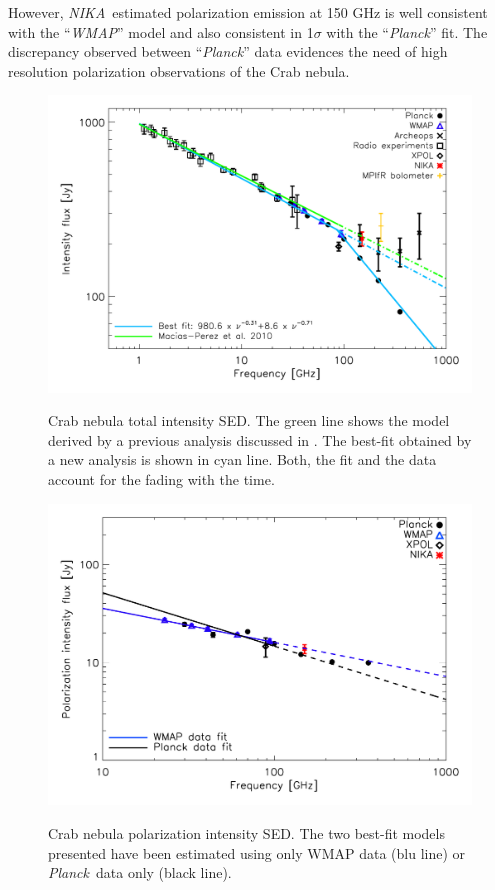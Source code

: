 \documentclass[twocolumn,traditabstract]{aa}
\def\NIKA{\textit{NIKA}}
\def\Planck{\textit{Planck}}
\def\WMAP{\textit{WMAP}}
\begin{document}
However, \NIKA\ estimated polarization emission at 150 GHz is well consistent with the ``\WMAP'' model and also consistent in 1$\sigma$ with the ``\Planck'' fit. 
The discrepancy observed between ``\Planck'' data evidences the need of high resolution polarization observations of the Crab nebula. 
\begin{figure}
  \centering
          { \includegraphics[width=1\linewidth,keepaspectratio]{figures/Crab_SED_i_150.pdf}}
           \caption{Crab nebula total intensity SED. The green line shows the model derived by a previous analysis discussed in \citep{macias2010}. The best-fit obtained by a new analysis is shown in cyan line. Both, the fit and the data account for the fading with the time.}
\label{crab_SED}		
  \end{figure} 

\begin{figure}
  \centering
             { \includegraphics[width=1\linewidth,keepaspectratio]{figures/Crab_SED_ipol.pdf}}
           \caption{Crab nebula polarization intensity SED. The two best-fit models presented have been estimated using only WMAP data (blu line) or \Planck\ data only (black line).}
\label{crab_SED_ipol}		
  \end{figure} 
 \noindent
\end{document}
